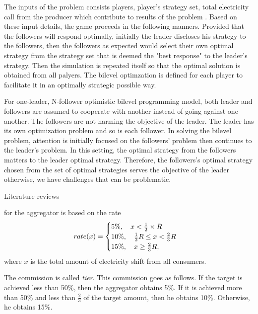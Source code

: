 \documentclass{article}
\begin{document}
The inputs of the problem consists players, player's strategy set, total electricity call from the producer which contribute to results of the problem \cite{yu2016}.
Based on these input details, the game proceeds in the following manners. 
Provided that the followers will respond optimally, initially the leader discloses his strategy to the followers, then the followers as expected would select their own optimal strategy from the strategy set that is deemed the "best response" to the leader's strategy.
Then the simulation is repeated itself so that the optimal solution is obtained from all palyers.
The bilevel optimzation is defined for each player to facilitate it in an optimally strategic possible way.

For one-leader, N-follower optimistic bilevel programming model, both leader and followers are assumed to cooperate with another instead of going against one another.
The followers are not harming the objective of the leader.
The leader has its own optimization problem and so is each follower.
In solving the bilevel problem, attention is initially focused on the followers' problem then continues to the leader's problem.
In this setting, the optimal strategy from the followers matters to the leader optimal strategy.
Therefore, the followers's optimal strategy chosen from the set of optimal strategies serves the objective of the leader otherwise, we have challenges that can be problematic.










\newpage
{\red Literature reviews}


\cite{sinha2018review}


\newpage

\vspace{0.4cm}

 for the aggregator is based on the rate
\begin{equation}
  rate(x) = 
  \begin{cases}
    5\%, \quad x < \frac12 \times R \\
    10 \%, \quad \frac12 R \le x < \frac23 R \\
    15 \%, \quad x \ge \frac23 R,
  \end{cases}
\end{equation}
where $x$ is the total amount of electricity shift from all consumers.

The commission is called \emph{tier}. 
This commission goes as follows.
If the target is achieved less than 50\%, then the aggregator obtains 5\%.
If it is achieved more than 50\% and less than $\frac23$ of the target amount, then he obtains 10\%.
Otherwise, he obtains 15\%.
\end{document}
